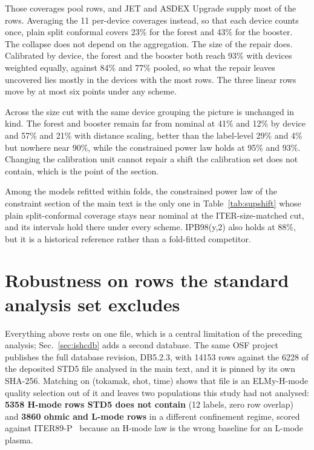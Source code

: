 \documentclass[12pt,letterpaper]{article}
\begin{document}
Those coverages pool rows, and JET and ASDEX Upgrade supply most of the rows.
Averaging the 11 per-device coverages instead, so that each device counts once,
plain split conformal covers 23\% for the forest and 43\% for the booster. The
collapse does not depend on the aggregation. The size of the repair does.
Calibrated by device, the forest and the booster both reach 93\% with devices
weighted equally, against 84\% and 77\% pooled, so what the repair leaves
uncovered lies mostly in the devices with the most rows. The three linear rows
move by at most six points under any scheme.

Across the size cut with the same device grouping the picture is unchanged in
kind. The forest and booster remain far from nominal at 41\% and 12\% by device
and 57\% and 21\% with distance scaling, better than the label-level 29\% and
4\% but nowhere near 90\%, while the constrained power law holds at 95\% and
93\%. Changing the calibration unit cannot repair a shift the calibration set
does not contain, which is the point of the section.

Among the models refitted within folds, the constrained power law of
the constraint section of the main text is the only one in Table~\ref{tab:supshift} whose plain
split-conformal coverage stays near nominal at the ITER-size-matched cut, and its
intervals hold there under every scheme. IPB98(y,2) also holds at 88\%, but it
is a historical reference rather than a fold-fitted competitor.

\section{Robustness on rows the standard analysis set excludes}
\label{supp:disjoint}

Everything above rests on one file, which is a central limitation of the preceding analysis; Sec.~\ref{sec:ishcdb} adds a second database.
The same OSF project publishes the full database revision, DB5.2.3, with 14153
rows against the 6228 of the deposited STD5 file analysed in the main text,
and it is pinned by its own SHA-256. Matching on (tokamak, shot, time) shows
that file is an ELMy-H-mode quality selection out of it
and leaves two populations this study had not analysed: \textbf{5358 H-mode rows
STD5 does not contain} (12 labels, zero row overlap) and \textbf{3860 ohmic
and L-mode rows} in a different confinement regime, scored against
ITER89-P~\cite{iter89p} because an H-mode law is the wrong baseline for an
L-mode plasma.
\end{document}
